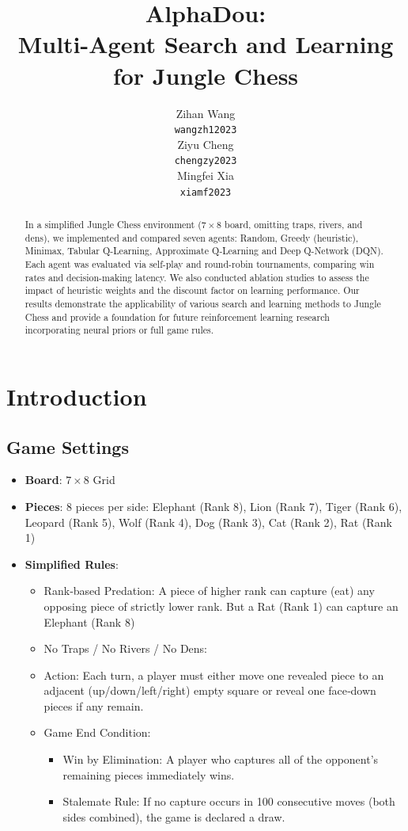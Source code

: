 \documentclass{article}
\title{AlphaDou: \\ Multi-Agent Search and Learning for Jungle Chess}
\author{%
  Zihan Wang \\
  \texttt{wangzh12023} \\
  \And
  Ziyu Cheng \\
  \texttt{chengzy2023} \\
  \And
  Mingfei Xia \\
  \texttt{xiamf2023} \\
}
\begin{document}
\maketitle


\begin{abstract}
In a simplified Jungle Chess environment ($7\times8$ board, omitting traps, rivers, and dens), we implemented and compared seven agents: Random, Greedy (heuristic), Minimax, Tabular Q-Learning, Approximate Q‐Learning and Deep Q-Network (DQN). Each agent was evaluated via self-play and round-robin tournaments, comparing win rates and decision-making latency. We also conducted ablation studies to assess the impact of heuristic weights and the discount factor on learning performance. Our results demonstrate the applicability of various search and learning methods to Jungle Chess and provide a foundation for future reinforcement learning research incorporating neural priors or full game rules.
\end{abstract}


\section{Introduction}

\subsection{Game Settings}

\begin{itemize}
    \item \textbf{Board}: $7 \times 8$ Grid
    \item \textbf{Pieces}: 8 pieces per side: Elephant (Rank 8), Lion (Rank 7), Tiger (Rank 6), Leopard (Rank 5), Wolf (Rank 4), Dog (Rank 3), Cat (Rank 2), Rat (Rank 1)
    \item \textbf{Simplified Rules}:
    \begin{itemize}
        \item Rank‐based Predation: A piece of higher rank can capture (eat) any opposing piece of strictly lower rank. But a Rat (Rank 1) can capture an Elephant (Rank 8)
        \item No Traps / No Rivers / No Dens:
        
        \item Action: Each turn, a player must either move  one revealed piece to an adjacent (up/down/left/right) empty square or reveal one  face‐down pieces if any remain.
    
        \item Game End Condition:
        \begin{itemize}
            \item Win by Elimination: A player who captures all of the opponent’s remaining pieces immediately wins.
            \item Stalemate Rule: If no capture occurs in 100 consecutive moves (both sides combined), the game is declared a draw.
        \end{itemize}
    \end{itemize}
\end{itemize}
\end{document}
